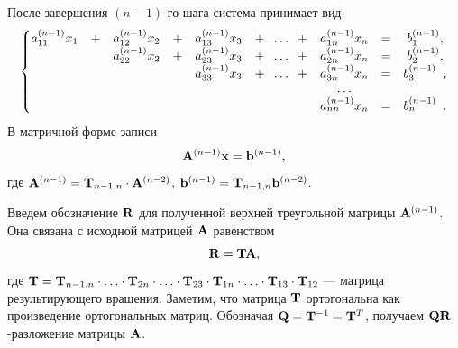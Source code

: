 \documentclass[12pt]{article}
\begin{document}
	После завершения $\left(n-1\right)$-го шага система принимает вид
	\begin{equation}
		\begin{gathered}
			\left\{
			\begin{matrix}
				a_{11}^{\left(n-1\right)}x_1 &+ &a_{12}^{\left(n-1\right)}x_2 &+ &a_{13}^{\left(n-1\right)}x_3&+\hspace{2mm}\ldots\hspace{2mm}+&a_{1n}^{\left(n-1\right)}x_n & = &b_{1}^{\left(n-1\right)},\\
				&&a_{22}^{\left(n-1\right)}x_2&+&a_{23}^{\left(n-1\right)}x_3&+\hspace{2mm}\ldots\hspace{2mm}+&a_{2n}^{\left(n-1\right)}x_n&=&b_{2}^{\left(n-1\right)},\\
				&  &  &  & a_{33}^{\left(n-1\right)}x_3 & +\hspace{2mm}\ldots \hspace{2mm}+ &a_{3n}^{\left(n-1\right)}x_n&=&b_{3}^{\left(n-1\right)}\hspace{1.9mm},\\
				&&&&&&\ldots\\
				&  &  &  &  &  &a_{nn}^{\left(n-1\right)}x_n&=&b_{n}^{\left(n-1\right)}\hspace{1.9mm}.
			\end{matrix}
			\right.
		\end{gathered}\label{fm15}
	\end{equation}
	В матричной форме записи
	\begin{equation}
		\bold{A}^{\left(n-1\right)}\bold{x}=\bold{b}^{\left(n-1\right)},
	\end{equation}
	где $\bold{A}^{\left(n-1\right)}=\bold{T}_{n-1,n}\cdot\bold{A}^{\left(n-2\right)}$, $\bold{b}^{\left(n-1\right)}=\bold{T}_{n-1,n}\bold{b}^{\left(n-2\right)}$.
	
	Введем обозначение $\bold R$ для полученной верхней треугольной матрицы $\bold{A}^{\left(n-1\right)}$. Она связана с исходной матрицей $\bold{A}$ равенством
	\begin{equation}
		\bold{R}=\bold{TA},
	\end{equation}
	где $\bold{T}=\bold{T}_{n-1,n}\cdot\ldots\cdot\bold{T}_{2n}\cdot\ldots\cdot\bold{T}_{23}\cdot\bold{T}_{1n}\cdot\ldots\cdot\bold{T}_{13}\cdot\bold{T}_{12}$ --- матрица результирующего вращения. Заметим, что матрица $\bold{T}$ ортогональна как произведение ортогональных матриц. Обозначая $\bold{Q}=\bold{T}^{-1}=\bold{T}^{T}$, получаем $\bold{QR}$-разложение матрицы $\bold{A}$.
	
\end{document}
